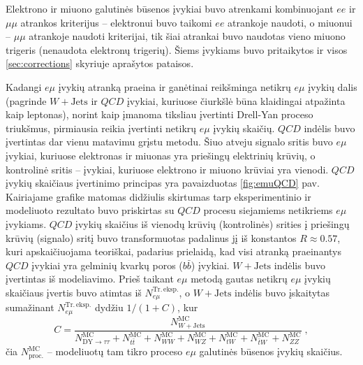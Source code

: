 \documentclass[a4paper, 12pt, twoside]{article}
\newcommand{\emu}{e\mu}
\newlength\q
\begin{document}
Elektrono ir miuono galutinės būsenos įvykiai buvo atrenkami kombinuojant $ee$ ir $\mu\mu$ atrankos
kriterijus -- elektronui buvo taikomi $ee$ atrankoje naudoti, o miuonui -- $\mu\mu$ atrankoje naudoti
kriterijai, tik šiai atrankai buvo naudotas vieno miuono trigeris (nenaudota elektronų trigerių).
Šiems įvykiams buvo pritaikytos ir visos \ref{sec:corrections} skyriuje aprašytos pataisos.

Kadangi $\emu$ įvykių atranką praeina ir ganėtinai reikšminga netikrų $\emu$ įvykių dalis (pagrinde
$W+\mathrm{Jets}$ ir $QCD$ įvykiai, kuriuose čiurkšlė būna klaidingai atpažinta kaip leptonas),
norint kaip įmanoma tiksliau įvertinti Drell-Yan proceso triukšmus, pirmiausia reikia
įvertinti netikrų $\emu$ įvykių skaičių.
$QCD$ indėlis buvo įvertintas dar vienu matavimu grįstu metodu.
Šiuo atveju signalo sritis buvo $\emu$ įvykiai, kuriuose elektronas ir miuonas yra priešingų elektrinių
krūvių, o kontrolinė sritis -- įvykiai, kuriuose elektrono ir miuono krūviai yra vienodi.
$QCD$ įvykių skaičiaus įvertinimo principas yra pavaizduotas \ref{fig:emuQCD} pav.
Kairiajame grafike matomas didžiulis skirtumas tarp eksperimentinio ir modeliuoto rezultato buvo
priskirtas su $QCD$ procesu siejamiems netikriems $\emu$ įvykiams.
$QCD$ įvykių skaičius iš vienodų krūvių (kontrolinės) srities į priešingų krūvių (signalo) sritį
buvo transformuotas padalinus jį iš konstantos $R\approx 0.57$, kuri apskaičiuojama teoriškai,
padarius prielaidą, kad visi atranką praeinantys $QCD$ įvykiai yra gelminių kvarkų poros
($b\bar{b}$) įvykiai.
$W+\mathrm{Jets}$ indėlis buvo įvertintas iš modeliavimo.
Prieš taikant $\emu$ metodą gautas netikrų $\emu$ įvykių skaičiaus įvertis buvo atimtas iš
$N_{e\mu}^{\mathrm{Tr. \, eksp.}}$, o $W+\mathrm{Jets}$ indėlis buvo įskaitytas sumažinant
$N_{e\mu}^{\mathrm{Tr. \, eksp.}}$ dydžiu $1/(1+C)$, kur
\begin{equation*}
	C = \frac{ N_{W+\mathrm{Jets}}^{\mathrm{MC}} } { N_{\mathrm{DY}\rightarrow\tau\tau}^{\mathrm{MC}} + 
	N_{t\bar{t}}^{\mathrm{MC}} + N_{WW}^{\mathrm{MC}} + N_{WZ}^{\mathrm{MC}} + N_{tW}^{\mathrm{MC}} + N_{\bar{t}W}^{\mathrm{MC}} +
	N_{ZZ}^{\mathrm{MC}} } \; ,
\end{equation*}
čia $N^{\mathrm{MC}}_{\mathrm{proc.}}$ -- modeliuotų tam tikro proceso $\emu$ galutinės būsenos įvykių skaičius.
\end{document}
